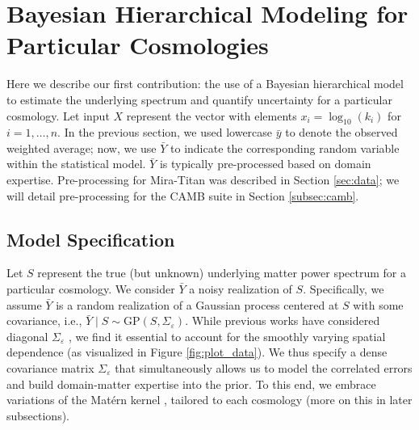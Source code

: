 \documentclass[11pt]{article}
\begin{document}
\section{Bayesian Hierarchical Modeling for Particular Cosmologies}
\label{sec:hm_fit}

Here we describe our first contribution: the use of a Bayesian hierarchical model 
to estimate the underlying spectrum and quantify uncertainty for a particular cosmology.
Let input $X$ represent the vector with elements $x_i = \log_{10}(k_i)$ for $i=1,\dots,n$.
In the previous section, we used lowercase $\bar{y}$ to denote 
the observed weighted average; now, we use $\bar{Y}$ to indicate the corresponding 
random variable within the statistical model.  
$\bar{Y}$ is typically pre-processed
based on domain expertise.  Pre-processing for Mira-Titan was described in Section 
\ref{sec:data}; we will detail pre-processing 
for the CAMB suite in Section \ref{subsec:camb}.

\subsection{Model Specification}
\label{sec:mod_spec}

Let $S$ represent the true (but unknown) underlying matter power spectrum for
a particular cosmology.  We consider $\bar{Y}$ a noisy realization of $S$.
Specifically, we assume $\bar{Y}$ is a random realization of a Gaussian 
process centered at $S$ with some covariance, i.e., 
$\bar{Y}\mid S \sim \mathrm{GP}(S, \Sigma_\varepsilon)$.  While previous works
have considered diagonal $\Sigma_\varepsilon$ \citep{moran2023mira}, we find it
essential to account for the smoothly varying spatial dependence
(as visualized in Figure \ref{fig:plot_data}).  We thus specify a dense 
covariance matrix $\Sigma_\varepsilon$ that simultaneously
allows us to model the correlated errors and build domain-matter expertise
into the prior. To this end, we embrace variations of the Mat\'ern kernel 
\citep{stein1999interpolation}, tailored to each cosmology (more on this in later 
subsections). 
\end{document}
